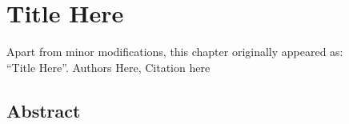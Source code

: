 \chapter{Title Here}
\thispagestyle{plain}
\vspace{-.5cm}

\noindent Apart from minor modifications, this chapter originally appeared as:\newline\\
\ssp ``Title Here''.
Authors Here, Citation here

\section*{Abstract}
    \dsp
    


